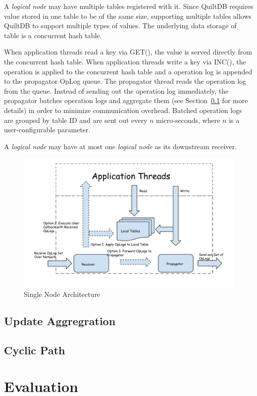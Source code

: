 \documentclass{acm_proc_article-sp}
\begin{document}
A \emph{logical node} may have multiple tables registered with it. Since QuiltDB
requires value stored in one table to be of the same size, supporting multiple 
tables allows QuiltDB to support multiple types of values. The underlying data 
storage of table is a concurrent hash table.

When application threads read a key via GET(), the value is served directly from
the concurrent hash table. When application threads write a key via INC(), the 
operation is applied to the concurrent hash table and a operation log is 
appended to the propagator OpLog queue. The propagator thread reads the 
operation log from the queue. Instead of sending out the operation log 
immediately, the propagator batches operation logs and aggregate them (see
Section~\ref{sec:update-aggreg} for more details) in order to minimize 
communication overhead. Batched operation logs are grouped by table ID and are
sent out every $n$ micro-seconds, where $n$ is a user-configurable parameter.

A \emph{logical node} may have at most one \emph{logical node} as its downstream
receiver.

\begin{figure}[th!]
  \centering
  \includegraphics[width=.5\textwidth]{fig/propagator-receiver.pdf}
  \caption{Single Node Architecture}
  \label{fig:prop-recv}
\end{figure}

\subsection{Update Aggregration}
\label{sec:update-aggreg}

\subsection{Cyclic Path}

\section{Evaluation}
\end{document}
